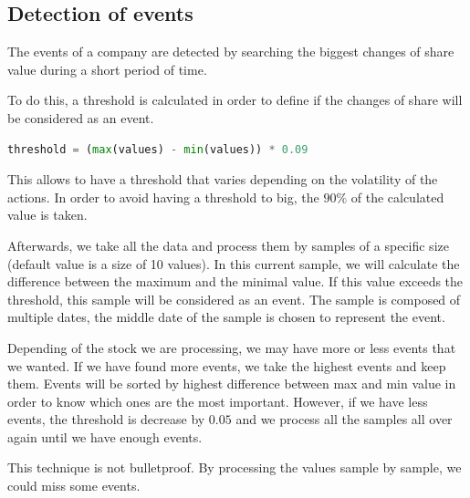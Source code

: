 \subsection{Detection of events}

The events of a company are detected by searching the biggest changes of share value during a short period of time.

To do this, a threshold is calculated in order to define if the changes of share will be considered as an event.

\begin{lstlisting}[language=python, belowskip=-1.0 \baselineskip]
    threshold = (max(values) - min(values)) * 0.09
\end{lstlisting}

This allows to have a threshold that varies depending on the volatility of the actions. In order to avoid having a threshold to big, the $90\%$ of the calculated value is taken.

Afterwards, we take all the data and process them by samples of a specific size (default value is a size of 10 values). In this current sample, we will calculate the difference between the maximum and the minimal value. If this value exceeds the threshold, this sample will be considered as an event. The sample is composed of multiple dates, the middle date of the sample is chosen to represent the event.

Depending of the stock we are processing, we may have more or less events that we wanted. If we have found more events, we take the highest events and keep them. Events will be sorted by highest difference between max and min value in order to know which ones are the most important. However, if we have less events, the threshold is decrease by $0.05$ and we process all the samples all over again until we have enough events.

This technique is not bulletproof. By processing the values sample by sample, we could miss some events.
